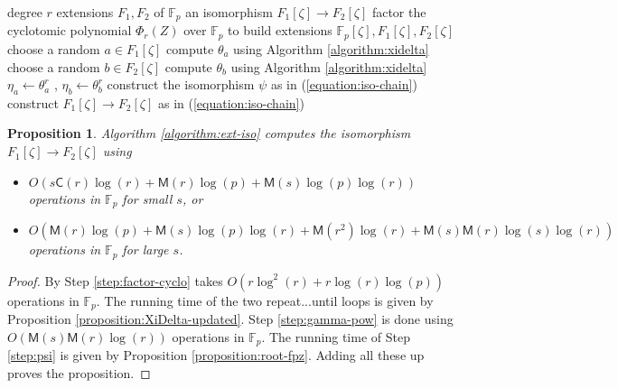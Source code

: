 \documentclass[12pt]{article}
\theoremstyle{plain}
\newtheorem{proposition}[theorem]{Proposition}
\theoremstyle{definition}
\def\F{\mathbb{F}}
\def\M{\mathsf{M}}
\def\CC{\mathsf{C}}
\newcounter{algorithm}
\begin{document}
\begin{algorithm}
\label{algorithm:ext-iso}
	\begin{algorithmic}[1]
		\REQUIRE degree $r$ extensions $F_1, F_2$ of $\F_p$
		\ENSURE an isomorphism $F_1[\zeta] \rightarrow F_2[\zeta]$
		\STATE\label{step:factor-cyclo} factor the cyclotomic polynomial $\Phi_r(Z)$ over $\F_p$ to build extensions $\F_p[\zeta], F_1[\zeta], F_2[\zeta]$
		\REPEAT
			\STATE choose a random $a \in F_1[\zeta]$
			\STATE compute $\theta_a$ using Algorithm \ref{algorithm:xidelta}
		\REPEAT
			\STATE choose a random $b \in F_2[\zeta]$
			\STATE compute $\theta_b$ using Algorithm \ref{algorithm:xidelta}
		\STATE\label{step:gamma-pow} $\eta_a \leftarrow \theta_a^r$ , $\eta_b \leftarrow \theta_b^r$
		\STATE\label{step:psi} construct the isomorphism $\psi$ as in (\ref{equation:iso-chain})
		\STATE construct $F_1[\zeta] \rightarrow F_2[\zeta]$ as in (\ref{equation:iso-chain})
	\end{algorithmic}
\end{algorithm}

\begin{proposition}
	Algorithm \ref{algorithm:ext-iso} computes the isomorphism $F_1[\zeta] \rightarrow F_2[\zeta]$ using
	\begin{itemize}
		\item $O(s\CC(r)\log(r) + \M(r)\log(p) + \M(s)\log(p)\log(r))$\\ operations in $\F_p$ for small $s$, or
		\item $O(\M(r)\log(p) + \M(s)\log(p)\log(r) + \M(r^2)\log(r) + \M(s)\M(r)\log(s)\log(r))$\\ operations in $\F_p$ for large $s$.
	\end{itemize}
\end{proposition}
\begin{proof}
	By \cite[Theorem 9]{shoup1994fast} Step \ref{step:factor-cyclo} takes $O(r\log^2(r) + r\log(r)\log(p))$ operations in $\F_p$. The running time of the two repeat...until loops is given by Proposition \ref{proposition:XiDelta-updated}. Step \ref{step:gamma-pow} is done using $O(\M(s)\M(r)\log(r))$ operations in $\F_p$. The running time of Step \ref{step:psi} is given by Proposition \ref{proposition:root-fpz}. Adding all these up proves the proposition.
\end{proof}
\end{document}
